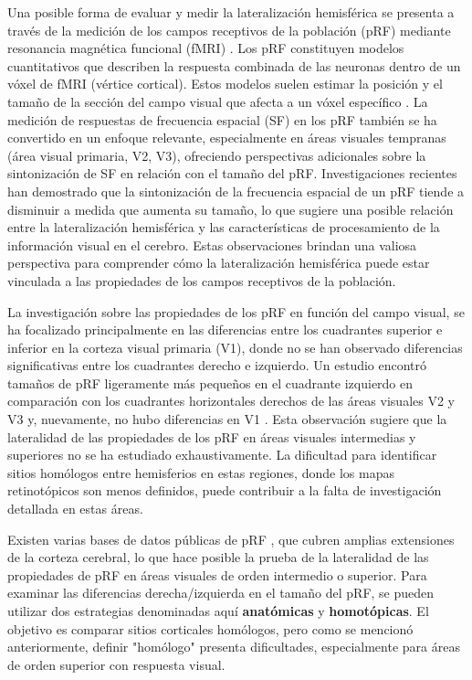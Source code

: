 	Una posible forma de evaluar y medir la lateralización hemisférica se presenta a través de la medición de los campos receptivos de la población (pRF) mediante resonancia magnética funcional (fMRI) \cite{dumoulin_population_2008, kay_principles_2018} . Los pRF constituyen modelos cuantitativos que describen la respuesta combinada de las neuronas dentro de un vóxel de fMRI (vértice cortical). Estos modelos suelen estimar la posición y el tamaño de la sección del campo visual que afecta a un vóxel específico \cite{wandell_computational_2015}. La medición de respuestas de frecuencia espacial (SF) en los pRF también se ha convertido en un enfoque relevante, especialmente en áreas visuales tempranas (área visual primaria, V2, V3), ofreciendo perspectivas adicionales sobre la sintonización de SF en relación con el tamaño del pRF. Investigaciones recientes \cite{aghajari_population_2020, broderick_mapping_2022} han demostrado que la sintonización de la frecuencia espacial de un pRF tiende a disminuir a medida que aumenta su tamaño, lo que sugiere una posible relación entre la lateralización hemisférica y las características de procesamiento de la información visual en el cerebro. Estas observaciones brindan una valiosa perspectiva para comprender cómo la lateralización hemisférica puede estar vinculada a las propiedades de los campos receptivos de la población.
	
	La investigación sobre las propiedades de los pRF en funci\'on del campo visual, se ha focalizado principalmente en las diferencias entre los cuadrantes superior e inferior en la corteza visual primaria (V1), donde no se han observado diferencias significativas entre los cuadrantes derecho e izquierdo. Un estudio encontró tamaños de pRF ligeramente más pequeños en el cuadrante izquierdo en comparación con los cuadrantes horizontales derechos de las \'areas visuales V2 y V3 y, nuevamente, no hubo diferencias en V1 \cite{silva_radial_2018}. Esta observación sugiere que la lateralidad de las propiedades de los pRF en áreas visuales intermedias y superiores no se ha estudiado exhaustivamente. La dificultad para identificar sitios homólogos entre hemisferios en estas regiones, donde los mapas retinotópicos son menos definidos, puede contribuir a la falta de investigación detallada en estas áreas.
	
	Existen varias bases de datos p\'ublicas de pRF \cite{benson_bayesian_2018,himmelberg_cross-dataset_2021}, que cubren amplias extensiones de la corteza cerebral, lo que hace posible la prueba de la lateralidad de las propiedades de pRF en \'areas visuales de orden intermedio o superior. Para examinar las diferencias derecha/izquierda en el tamaño del pRF, se pueden utilizar dos estrategias denominadas aquí \textbf{anatómicas} y \textbf{homotópicas}. El objetivo es comparar sitios corticales homólogos, pero como se mencionó anteriormente, definir "homólogo" presenta dificultades, especialmente para áreas de orden superior con respuesta visual.
	

